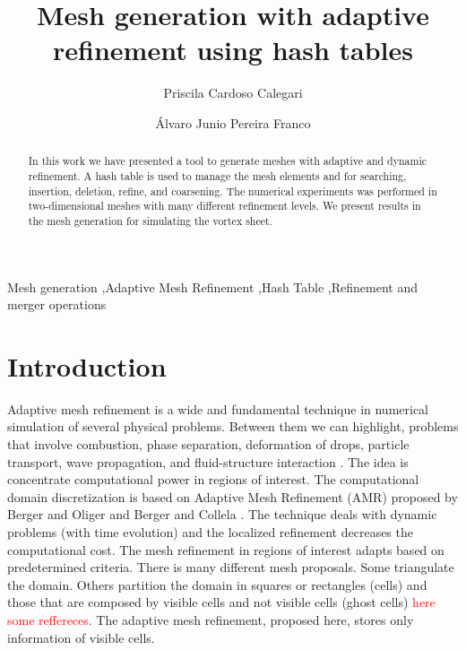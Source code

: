 \documentclass[review]{elsarticle}
\begin{document}
\begin{frontmatter}
  
\title{Mesh generation with adaptive refinement using hash tables}
\author[1]{Priscila Cardoso Calegari }
\address[1]{Departamento de Computa\c{c}\~ao, Universidade Federal de Santa Catarina, Ararangu\'a, SC, Brazil}
\author[2]{\'Alvaro Junio Pereira Franco}
\address[2]{Departamento de Inform\'atica e Estat\'istica, Universidade Federal de Santa Catarina, Florian\'opolis, SC, Brazil}

\begin{abstract}
In this work we have presented a tool to generate meshes with adaptive and dynamic refinement. A hash table is used to manage the mesh elements and for searching, insertion, deletion, refine, and coarsening. The numerical experiments was performed in two-dimensional meshes with many different refinement levels. We present results in the mesh generation for simulating the vortex sheet.
\end{abstract}

\begin{keyword} 
  Mesh generation \sep Adaptive Mesh Refinement \sep Hash Table \sep Refinement and merger operations
  \end{keyword}
\end{frontmatter}

\linenumbers

\section{Introduction}\label{sec-introduction}

Adaptive mesh refinement is a wide and fundamental technique in numerical simulation of several physical problems. Between them we can highlight, problems that involve combustion, phase separation, deformation of drops, particle transport, wave propagation, and fluid-structure interaction \cite{ROM99,DUA13,PEM98,BER84,BEL05,CEC10,WEL15}. The idea is concentrate computational power in regions of interest. The computational domain discretization is based on Adaptive Mesh Refinement (AMR) proposed by Berger and Oliger \cite{BER84} and Berger and Collela \cite{BER89}. The technique deals with dynamic problems (with time evolution) and the localized refinement decreases the computational cost. The mesh refinement in regions of interest adapts based on predetermined criteria. There is many different mesh proposals. Some triangulate the domain. Others partition the domain in squares or rectangles (cells) and those that are composed by visible cells and not visible cells (ghost cells) \textcolor{red}{here some reffereces}. The adaptive mesh refinement, proposed here, stores only information of visible cells. 
 
\end{document}
